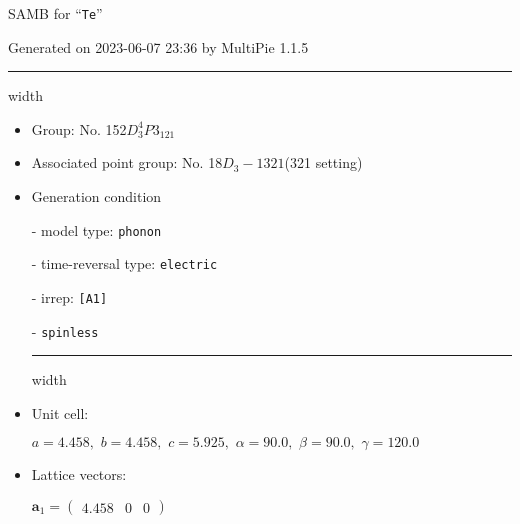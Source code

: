 \documentclass[fleqn,10pt,landscape]{article}
\begin{document}
\setcounter{MaxMatrixCols}{16}

\setlength{\baselineskip}{16pt}
\footnotesize
\begin{center}
\LARGE
SAMB for ``\texttt{Te}''
\end{center}
\begin{flushright}
Generated on 2023-06-07 23:36 by MultiPie 1.1.5
\end{flushright}
\vspace{1cm}


 \hfil \hrule height 1mm width \textwidth \hfil

\begin{itemize}
\item Group: No. 152\quad$D_{3}^{4}$\quad$P3_121$\quad[ trigonal ]

\item Associated point group: No. 18\quad$D_{3}-1$\quad$321$\quad(321 setting)\quad[ trigonal ]

\vspace{5mm}

\item Generation condition

\quad - model type: \texttt{phonon}

\quad - time-reversal type: \texttt{electric}

\quad - irrep: \texttt{[A1]}

\quad - \texttt{spinless}


 \hfil \hrule height 1mm width \textwidth \hfil

\item Unit cell:

\quad $a=4.458,\,\, b=4.458,\,\, c=5.925,\,\, \alpha=90.0,\,\, \beta=90.0,\,\, \gamma=120.0$

\item Lattice vectors:

\quad $\bm{a}_1=\begin{pmatrix} 4.458 & 0 & 0 \end{pmatrix}$


\end{itemize}
\end{document}
